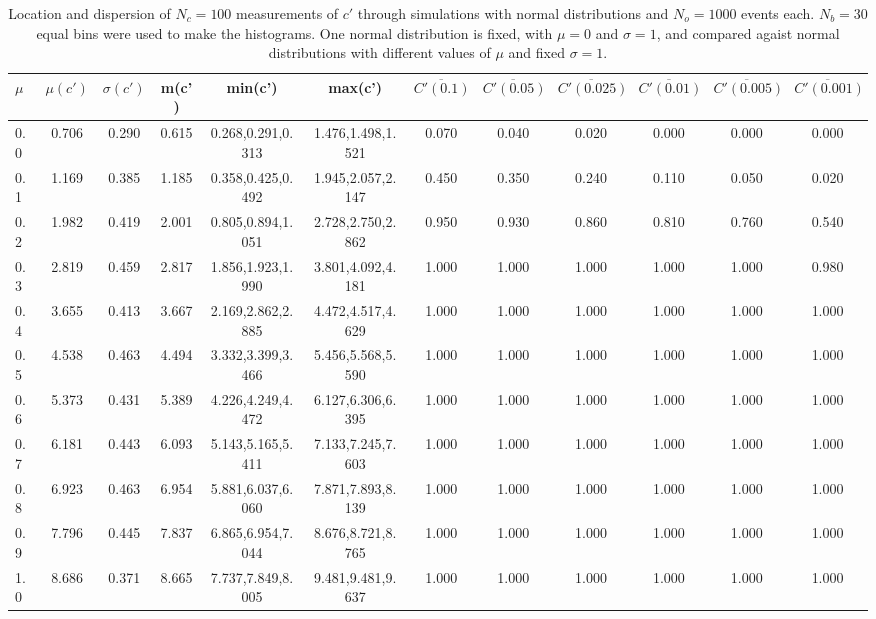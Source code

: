 \begin{table*}[h!]
\begin{center}
\begin{tabular}{| l | c | c | c | c | c | c | c | c | c | c | c |}\hline
$\mu$ & $\mu(c')$ & $\sigma(c')$ & m(c') & min(c') & max(c') & $\overline{C'(0.1)}$ & $\overline{C'(0.05)}$ & $\overline{C'(0.025)}$ & $\overline{C'(0.01)}$ & $\overline{C'(0.005)}$ & $\overline{C'(0.001)}$ \\\hline
0.0 & 0.706 & 0.290 & 0.615 & 0.268,0.291,0.313 & 1.476,1.498,1.521  & 0.070  & 0.040  & 0.020  & 0.000  & 0.000  & 0.000 \\\hline
0.1 & 1.169 & 0.385 & 1.185 & 0.358,0.425,0.492 & 1.945,2.057,2.147  & 0.450  & 0.350  & 0.240  & 0.110  & 0.050  & 0.020 \\\hline
0.2 & 1.982 & 0.419 & 2.001 & 0.805,0.894,1.051 & 2.728,2.750,2.862  & 0.950  & 0.930  & 0.860  & 0.810  & 0.760  & 0.540 \\\hline
0.3 & 2.819 & 0.459 & 2.817 & 1.856,1.923,1.990 & 3.801,4.092,4.181  & 1.000  & 1.000  & 1.000  & 1.000  & 1.000  & 0.980 \\\hline
0.4 & 3.655 & 0.413 & 3.667 & 2.169,2.862,2.885 & 4.472,4.517,4.629  & 1.000  & 1.000  & 1.000  & 1.000  & 1.000  & 1.000 \\\hline
0.5 & 4.538 & 0.463 & 4.494 & 3.332,3.399,3.466 & 5.456,5.568,5.590  & 1.000  & 1.000  & 1.000  & 1.000  & 1.000  & 1.000 \\\hline
0.6 & 5.373 & 0.431 & 5.389 & 4.226,4.249,4.472 & 6.127,6.306,6.395  & 1.000  & 1.000  & 1.000  & 1.000  & 1.000  & 1.000 \\\hline
0.7 & 6.181 & 0.443 & 6.093 & 5.143,5.165,5.411 & 7.133,7.245,7.603  & 1.000  & 1.000  & 1.000  & 1.000  & 1.000  & 1.000 \\\hline
0.8 & 6.923 & 0.463 & 6.954 & 5.881,6.037,6.060 & 7.871,7.893,8.139  & 1.000  & 1.000  & 1.000  & 1.000  & 1.000  & 1.000 \\\hline
0.9 & 7.796 & 0.445 & 7.837 & 6.865,6.954,7.044 & 8.676,8.721,8.765  & 1.000  & 1.000  & 1.000  & 1.000  & 1.000  & 1.000 \\\hline
1.0 & 8.686 & 0.371 & 8.665 & 7.737,7.849,8.005 & 9.481,9.481,9.637  & 1.000  & 1.000  & 1.000  & 1.000  & 1.000  & 1.000 \\\hline
\end{tabular}
\caption{Location and dispersion of $N_c=100$
measurements of $c'$ through simulations
with normal distributions and $N_o=1000$ events each.
$N_b=30$ equal bins were used to make the histograms.
One normal distribution is fixed, with $\mu=0$ and $\sigma=1$,
and compared agaist normal distributions with different values of $\mu$ and fixed $\sigma=1$.}
\end{center}
\end{table*}